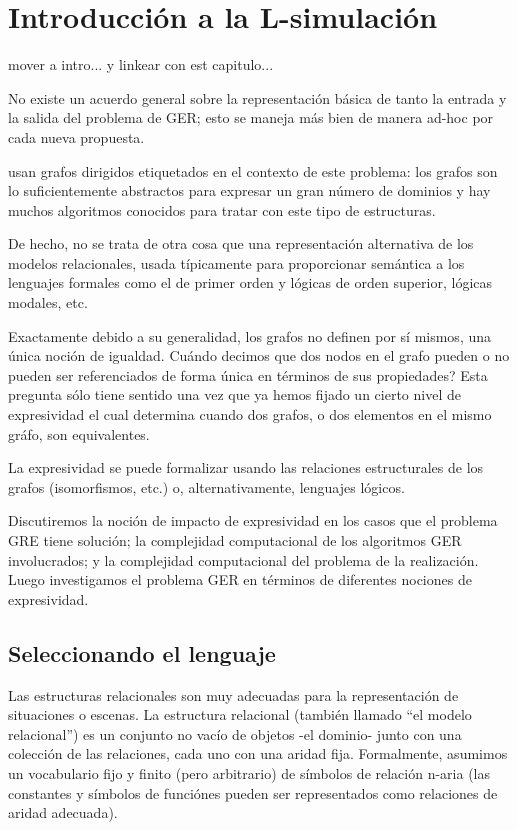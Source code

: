 \chapter{Introducci\'on a la L-simulaci\'on}
\label{sec:intro_logica}

mover a intro... y linkear con est capitulo...

No existe un acuerdo general sobre la representaci\'on b\'asica de
tanto la entrada y la salida del problema de GER; esto se maneja m\'as bien de manera ad-hoc
por cada nueva propuesta.

\cite{Krahmer2003} usan grafos dirigidos etiquetados en el contexto de este problema: los grafos son lo suficientemente abstractos 
para expresar un gran n\'umero de dominios y hay muchos algoritmos conocidos para tratar
con este tipo de estructuras. 

De hecho, no se trata de otra cosa que una representaci\'on alternativa de los modelos relacionales, usada t\'ipicamente 
para proporcionar sem\'antica a los lenguajes formales como el de primer orden y l\'ogicas de orden superior, l\'ogicas modales, etc.


Exactamente debido a su generalidad, los grafos no definen por s\'i mismos, una \'unica noci\'on de igualdad. Cu\'ando decimos 
que dos nodos en el grafo pueden o no pueden ser
referenciados de forma \'unica en t\'erminos de sus propiedades? Esta pregunta s\'olo tiene sentido una vez que ya hemos 
fijado un cierto nivel de expresividad el cual determina cuando dos grafos, o dos elementos en el mismo gr\'afo, son equivalentes.

La expresividad se puede formalizar usando las relaciones estructurales de los grafos (isomorfismos, etc.) o, alternativamente, 
lenguajes l\'ogicos. 

Discutiremos la noci\'on de impacto de expresividad 
en los casos que el problema GRE tiene soluci\'on; la complejidad computacional de los algoritmos GER involucrados; 
y la complejidad computacional del problema de la realizaci\'on. Luego investigamos el problema GER en t\'erminos de diferentes 
nociones de expresividad. 


\section{Seleccionando el lenguaje}


Las estructuras relacionales son muy adecuadas para la representaci\'on de situaciones o escenas. La estructura relacional (tambi\'en llamado ``el modelo relacional'') es un conjunto no vac\'io de objetos -el dominio- junto con una colecci\'on de las relaciones, cada uno con una aridad fija.
Formalmente, asumimos un vocabulario fijo y finito (pero arbitrario) de
s\'imbolos de relaci\'on n-aria (las constantes y s\'imbolos de funci\'ones pueden ser representados como relaciones de aridad adecuada). 


